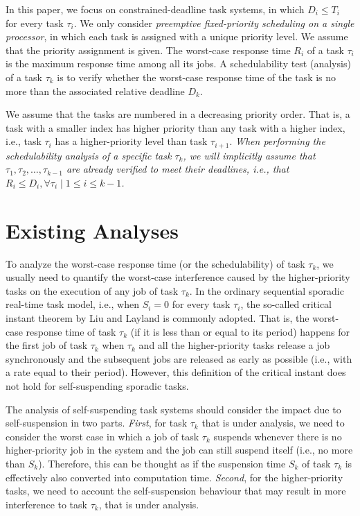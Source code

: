 \documentclass[10pt,conference,preprint]{IEEEtran}
\begin{document}
In this paper, we focus on constrained-deadline task systems, in which
$D_i \leq T_i$ for every task $\tau_i$. We only consider
\emph{preemptive fixed-priority scheduling on a single processor}, in
which each task is assigned with a unique priority level. We assume
that the priority assignment is given. The worst-case response
time $R_i$ of a task $\tau_i$ is the maximum response time among all its
jobs. A schedulability test (analysis) of a task $\tau_k$
is to verify whether the worst-case response time of the task is no more than the associated relative deadline $D_k$.

We assume that the tasks are numbered in a decreasing priority order. That is, a task with a smaller index has higher priority than any task with a higher index, i.e., task $\tau_i$ has a higher-priority level than task $\tau_{i+1}$. \emph{When performing the schedulability analysis of a specific task $\tau_k$, we will implicitly assume that $\tau_1, \tau_2, \ldots, \tau_{k-1}$ are already verified to meet their deadlines, i.e., that $R_i \leq D_i, \forall \tau_i \mid 1 \leq i \leq k-1$. }

\section{Existing Analyses}
\label{sec:existing-analyses}

To analyze the worst-case response time (or the schedulability) of task $\tau_k$, we usually need to quantify the worst-case interference caused by the higher-priority tasks on the execution of any job of task $\tau_k$. In the ordinary sequential sporadic real-time task model, i.e., when $S_i=0$ for every task $\tau_i$, the so-called critical instant theorem by Liu and Layland \cite{Liu_1973} is commonly adopted. That is, the worst-case response time of task $\tau_k$ (if it is less than or equal to its period) happens for the first job of task $\tau_k$ when $\tau_k$ and all the higher-priority tasks release a job synchronously and the subsequent jobs are released as early as possible (i.e., with a rate equal to their period).  However,  this definition of the
critical instant does not hold for self-suspending sporadic tasks.  


The analysis of self-suspending task systems should consider the
impact due to self-suspension in two parts. \emph{First}, for task
$\tau_k$ that is under analysis, we need to consider the worst case in
which a job of task $\tau_k$ suspends whenever there is no
higher-priority job in the system and the job can still suspend itself
(i.e., no more than $S_k$). Therefore, this can be thought as if the
suspension time $S_k$ of task $\tau_k$ is effectively also converted
into computation time. \emph{Second}, for the higher-priority tasks,
we need to account the self-suspension behaviour that may result in
more interference to task $\tau_k$, that is under analysis.
\end{document}
